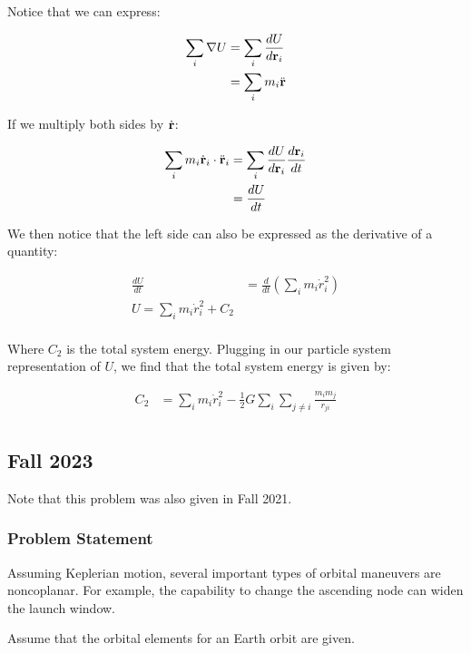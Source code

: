 Notice that we can express:

\begin{align*}
    \sum_i \nabla U &= \sum_i\frac{d U}{d \mathbf{r}_i} \\
    &= \sum_i m_i \ddot{\mathbf{r}}
\end{align*}

If we multiply both sides by $\dot{\mathbf{r}}$:

\begin{align*}
    \sum_i m_i \dot{\mathbf{r}}_i \cdot \ddot{\mathbf{r}}_i &= \sum_i\frac{d U}{d \mathbf{r}_i} \frac{d \mathbf{r}_i}{dt} \\
    &= \frac{d U}{dt} \\
\end{align*}

We then notice that the left side can also be expressed as the derivative of a quantity:

\begin{align*}
    \frac{dU}{dt} &= \frac{d}{dt} \left( \sum_i m_i \dot{r}_i^2 \right) \\
    U = \sum_i m_i \dot{r}_i^2 + C_2 \\
\end{align*}

Where $C_2$ is the total system energy. Plugging in our particle system representation of $U$, we find that the total system energy is given by:

\begin{align*}
    C_2 &= \sum_i m_i \dot{r}_i^2 - \frac{1}{2} G \sum_i \sum_{j \neq i} \frac{m_i m_j}{r_{ji}} \\
\end{align*}


\subsection{Fall 2023}

Note that this problem was also given in Fall 2021.

\subsubsection{Problem Statement}

Assuming Keplerian motion, several important types of orbital maneuvers are noncoplanar. For example, the capability to change the ascending node can widen the launch window.

Assume that the orbital elements for an Earth orbit are given.

